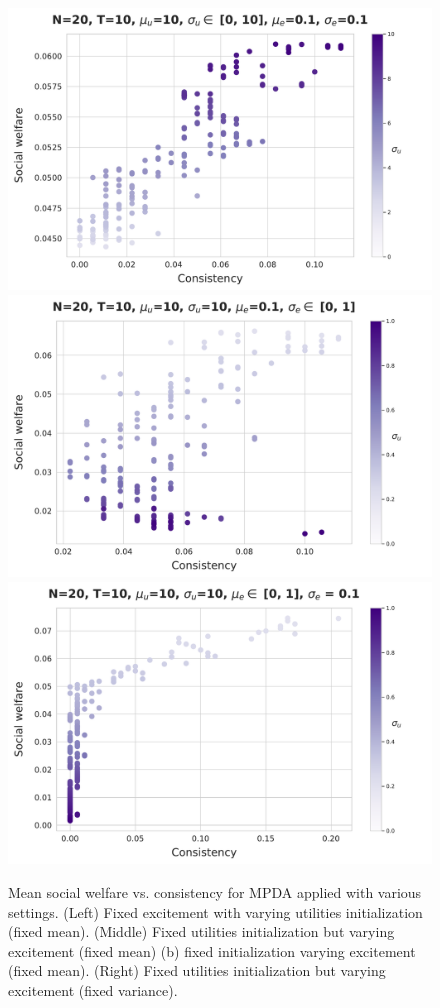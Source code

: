 \begin{figure}
    \centering
    \includegraphics[width=0.32\linewidth]{figures/mpda_dynamics_initliazation.pdf}
    \includegraphics[width=0.32\linewidth]{figures/mpda_dynamics_excitement_std.pdf}
    \includegraphics[width=0.32\linewidth]{figures/mpda_dynamics_excitement_mean.pdf}
     \caption{Mean social welfare vs. consistency for MPDA applied with various settings. (Left) Fixed excitement with varying utilities initialization (fixed mean). (Middle) Fixed utilities initialization but varying excitement (fixed mean) (b) fixed initialization varying excitement (fixed mean). (Right) Fixed utilities initialization but varying excitement (fixed variance).}
    \label{fig:mpda_dynamics}
\end{figure}
